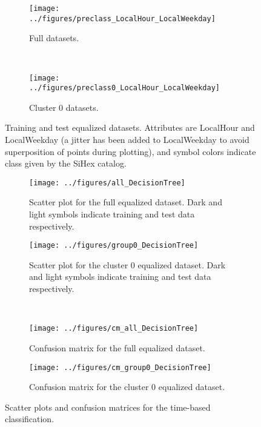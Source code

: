 \begin{figure}
\centering
\begin{subfigure}[t]{0.95\textwidth}
	\centering
	\texttt{[image: ../figures/preclass\_LocalHour\_LocalWeekday]}
	\caption{Full datasets.} 
	\label{fg:time_test_train_all}
\end{subfigure}
~
\begin{subfigure}[t]{0.95\textwidth}
	\centering
	\texttt{[image: ../figures/preclass0\_LocalHour\_LocalWeekday]}
	\caption{Cluster 0 datasets.}
	\label{time_test_train_0}
\end{subfigure}
\caption{Training and test equalized datasets. Attributes are LocalHour and LocalWeekday (a jitter has been added to LocalWeekday to avoid superposition of points during plotting), and symbol colors indicate class given by the SiHex catalog. }
\label{fg:time_test_train}
\end{figure}

\begin{figure}
\centering
\begin{subfigure}[t]{0.45\textwidth}
	\centering
	\texttt{[image: ../figures/all\_DecisionTree]}
	\caption{Scatter plot for the full equalized dataset. Dark and light symbols indicate training and test data respectively.} 
	\label{all_DecisionTree}
\end{subfigure}
\begin{subfigure}[t]{0.45\textwidth}
	\centering
	\texttt{[image: ../figures/group0\_DecisionTree]}
	\caption{Scatter plot for the cluster 0 equalized dataset. Dark and light symbols indicate training and test data respectively.}
	\label{group0_DecisionTree}
\end{subfigure}
~
\begin{subfigure}[t]{0.45\textwidth}
	\centering
	\texttt{[image: ../figures/cm\_all\_DecisionTree]}
	\caption{Confusion matrix for the full equalized dataset.} 
	\label{cm_all_DecisionTree}
\end{subfigure}
\begin{subfigure}[t]{0.45\textwidth}
	\centering
	\texttt{[image: ../figures/cm\_group0\_DecisionTree]}
	\caption{Confusion matrix for the cluster 0 equalized dataset.}
	\label{cm_group0_DecisionTree}
\end{subfigure}
\caption{Scatter plots and confusion matrices for the time-based classification. }
\label{fg:time_classification}
\end{figure}


